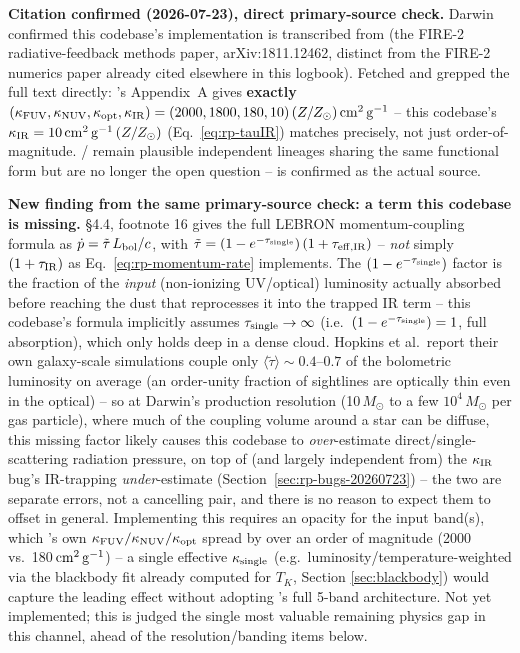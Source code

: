 \textbf{Citation confirmed (2026-07-23), direct primary-source check.}
Darwin confirmed this codebase's implementation is transcribed from
\citet{Hopkins2020} (the FIRE-2 radiative-feedback methods paper,
arXiv:1811.12462, distinct from the FIRE-2 numerics paper
\citet{Hopkins2018} already cited elsewhere in this logbook). Fetched
and grepped the full text directly: \citet{Hopkins2020}'s Appendix~A
gives \textbf{exactly}
$(\kappa_{\rm FUV},\kappa_{\rm NUV},\kappa_{\rm opt},\kappa_{\rm IR}) =
(2000, 1800, 180, 10)\,(Z/Z_\odot)\,{\rm cm^2\,g^{-1}}$ -- this
codebase's $\kappa_{\rm IR}=10\,{\rm cm^2\,g^{-1}}\,(Z/Z_\odot)$
(Eq.~\ref{eq:rp-tauIR}) matches precisely, not just order-of-magnitude.
\citet{Agertz2013}/\citet{Marinacci2019} remain plausible independent
lineages sharing the same functional form but are no longer the
open question -- \citet{Hopkins2020} is confirmed as the actual source.

\textbf{New finding from the same primary-source check: a term this
codebase is missing.} \citet{Hopkins2020} \S4.4, footnote 16 gives the
full LEBRON momentum-coupling formula as
$\dot p = \tilde\tau\,L_{\rm bol}/c$, with
$\tilde\tau = (1-e^{-\tau_{\rm single}})\,(1+\tau_{\rm eff,IR})$ --
\emph{not} simply $(1+\tau_{\rm IR})$ as
Eq.~\ref{eq:rp-momentum-rate} implements. The
$(1-e^{-\tau_{\rm single}})$ factor is the fraction of the
\emph{input} (non-ionizing UV/optical) luminosity actually absorbed
before reaching the dust that reprocesses it into the trapped IR
term -- this codebase's formula implicitly assumes
$\tau_{\rm single}\to\infty$ (i.e.\ $(1-e^{-\tau_{\rm single}})=1$,
full absorption), which only holds deep in a dense cloud. Hopkins et
al.\ report their own galaxy-scale simulations couple only
$\langle\tilde\tau\rangle\sim0.4$--$0.7$ of the bolometric luminosity
on average (an order-unity fraction of sightlines are optically thin
even in the optical) -- so at Darwin's production resolution
(10\,$M_\odot$ to a few $10^4\,M_\odot$ per gas particle), where much
of the coupling volume around a star can be diffuse, this
missing factor likely causes this codebase to \emph{over}-estimate
direct/single-scattering radiation pressure, on top of (and largely
independent from) the $\kappa_{\rm IR}$ bug's IR-trapping
\emph{under}-estimate (Section~\ref{sec:rp-bugs-20260723}) -- the two
are separate errors, not a cancelling pair, and there is no reason to
expect them to offset in general. Implementing this requires an
opacity for the input band(s), which \citet{Hopkins2020}'s own
$\kappa_{\rm FUV}/\kappa_{\rm NUV}/\kappa_{\rm opt}$ spread by over an
order of magnitude (2000 vs.\ 180\,${\rm cm^2\,g^{-1}}$) -- a single
effective $\kappa_{\rm single}$ (e.g.\ luminosity/temperature-weighted
via the blackbody fit already computed for $T_K$, Section
\ref{sec:blackbody}) would capture the leading effect without adopting
\citet{Hopkins2020}'s full 5-band architecture. Not yet implemented;
this is judged the single most valuable remaining physics gap in this
channel, ahead of the resolution/banding items below.

